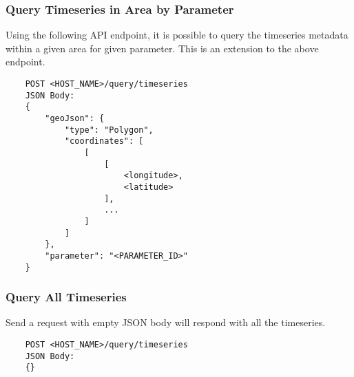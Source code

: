 \subsubsection{Query Timeseries in Area by Parameter}
Using the following API endpoint, it is possible to query the timeseries metadata within a given area for given parameter. This is an extension to the above endpoint.
\begin{lstlisting}
    POST <HOST_NAME>/query/timeseries
    JSON Body:
    {
        "geoJson": {
            "type": "Polygon",
            "coordinates": [
                [
                    [
                        <longitude>,
                        <latitude>
                    ],
                    ...
                ]
            ]
        },
        "parameter": "<PARAMETER_ID>"
    }
\end{lstlisting}

\subsubsection{Query All Timeseries}
Send a request with empty JSON body will respond with all the timeseries.
\begin{lstlisting}
    POST <HOST_NAME>/query/timeseries
    JSON Body:
    {}
\end{lstlisting}
